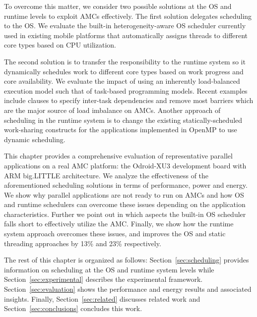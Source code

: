 To overcome this matter, we consider two possible solutions at the OS and runtime levels to exploit AMCs effectively.
The first solution delegates scheduling to the OS.
We evaluate the built-in heterogeneity-aware OS scheduler currently used in existing mobile platforms that automatically assigns threads to different core types based on CPU utilization. 

The second solution is to transfer the responsibility to the runtime system so it dynamically schedules work to different core types based on work progress and core availability. 
We evaluate the impact of using an inherently load-balanced execution model such that of task-based programming models. 
Recent examples~\cite{Ayguade:TPDS2009, OpenMP4.0:Manual2013, OmpSs_PPL11, vectorMulticore, Bauer.2012.SC,rollback,Vandierendonck:PACT2011, Vandierendonck:Hyperq,spawn} include clauses to specify inter-task dependencies and remove most barriers which are the major source of load imbalance on AMCs.
Another approach of scheduling in the runtime system is to change the existing statically-scheduled work-sharing constructs for the applications implemented in OpenMP to use dynamic scheduling. 

This chapter provides a comprehensive evaluation of representative parallel applications on a real AMC platform: the Odroid-XU3 development board with ARM big.LITTLE architecture.
We analyze the effectiveness of the aforementioned scheduling solutions in terms of performance, power and energy.
We show why parallel applications are not ready to run on AMCs and how OS and runtime schedulers can overcome these issues depending on the application characteristics.
Further we point out in which aspects the built-in OS scheduler falls short to effectively utilize the AMC.
Finally, we show how the runtime system approach overcomes these issues, and improves the OS and static threading approaches by 13\% and 23\% respectively.

The rest of this chapter is organized as follows: Section~\ref{sec:scheduling} provides information on 
scheduling at the OS and runtime system levels while Section~\ref{sec:experimental} describes the experimental framework. 
Section~\ref{sec:evaluation} shows the performance and energy results and associated insights.%
Finally, Section~\ref{sec:related} discusses related work and Section~\ref{sec:conclusions} concludes this work. 

